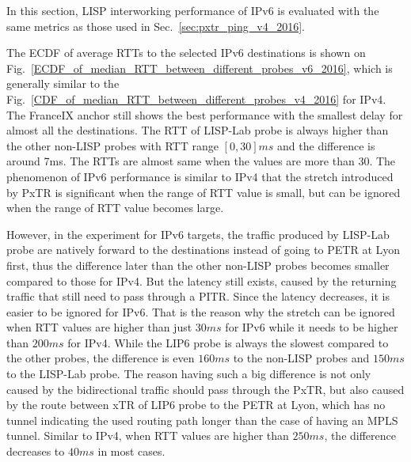 In this section, LISP interworking performance of IPv6 is evaluated with the same metrics as those used in Sec.~\ref{sec:pxtr_ping_v4_2016}.

The ECDF of average RTTs to the selected IPv6 destinations is shown on Fig.~\ref{ECDF_of_median_RTT_between_different_probes_v6_2016}, which is generally similar to the Fig.~\ref{CDF_of_median_RTT_between_different_probes_v4_2016} for IPv4. The FranceIX anchor still shows the best performance with the smallest delay for almost all the destinations. The RTT of LISP-Lab probe is always higher than the other non-LISP probes with RTT range $[0, 30]ms$ and the difference is around 7ms. The RTTs are almost same when the values are more than 30. The phenomenon of IPv6 performance is similar to IPv4 that the stretch introduced by PxTR is significant when the range of RTT value is small, but can be ignored when the range of RTT value becomes large. 

However, in the experiment for IPv6 targets, the traffic produced by LISP-Lab probe are natively forward to the destinations instead of going to PETR at Lyon first, thus the difference later than the other non-LISP probes becomes smaller compared to those for IPv4. But the latency still exists, caused by the returning traffic that still need to pass through a PITR. Since the latency decreases, it is easier to be ignored for IPv6. That is the reason why the stretch can be ignored when RTT values are higher than just $30ms$ for IPv6 while it needs to be higher than $200ms$ for IPv4. While the LIP6 probe is always the slowest compared to the other probes, the difference is even $160ms$ to the non-LISP probes and $150ms$ to the LISP-Lab probe. The reason having such a big difference is not only caused by the bidirectional traffic should pass through the PxTR, but also caused by the route between xTR of LIP6 probe to the PETR at Lyon, which has no tunnel indicating the used routing path longer than the case of having an MPLS tunnel. Similar to IPv4, when RTT values are higher than $250ms$, the difference decreases to $40ms$ in most cases.

